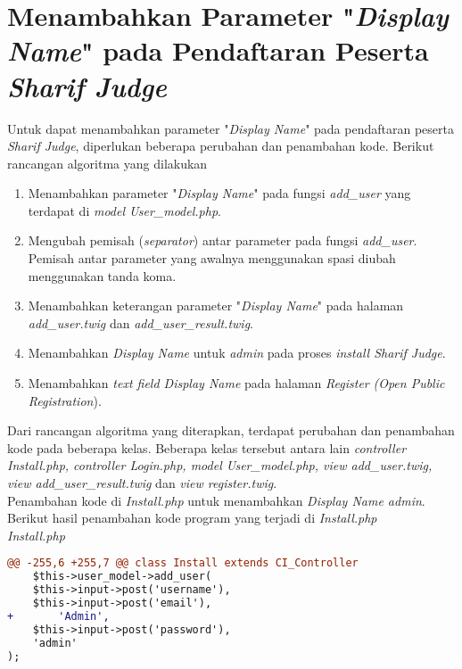 \section{Menambahkan Parameter "\textit{Display Name}" pada Pendaftaran Peserta \textit{Sharif Judge}}
Untuk dapat menambahkan parameter "\textit{Display Name}" pada pendaftaran peserta \textit{Sharif Judge}, diperlukan beberapa perubahan dan penambahan kode. Berikut rancangan algoritma yang dilakukan
\begin{enumerate}
	\item Menambahkan parameter "\textit{Display Name}" pada fungsi \textit{add\_user} yang terdapat di \textit{model User\_model.php}.
	\item Mengubah pemisah (\textit{separator}) antar parameter pada fungsi \textit{add\_user}. Pemisah antar parameter yang awalnya menggunakan spasi diubah menggunakan tanda koma.
	\item Menambahkan keterangan parameter "\textit{Display Name}" pada halaman \textit{add\_user.twig} dan  \textit{add\_user\_result.twig}.
	\item Menambahkan \textit{Display Name} untuk \textit{admin} pada proses \textit{install Sharif Judge}.
	\item Menambahkan \textit{text field Display Name} pada halaman \textit{Register} \textit{(Open Public Registration}).
\end{enumerate}
Dari rancangan algoritma yang diterapkan, terdapat perubahan dan penambahan kode pada beberapa kelas. Beberapa kelas tersebut antara lain \textit{controller Install.php, controller Login.php, model User\_model.php, view add\_user.twig, view add\_user\_result.twig} dan \textit{view register.twig}.
~\\
Penambahan kode di \textit{Install.php} untuk menambahkan \textit{Display Name admin}. Berikut hasil penambahan kode program yang terjadi di \textit{Install.php}\\
\textit{Install.php}
\begin{lstlisting}[language=diff, basicstyle=\ttfamily, frame=single,
columns=fullflexible, keepspaces=true, breaklines=true]
@@ -255,6 +255,7 @@ class Install extends CI_Controller
	$this->user_model->add_user(
	$this->input->post('username'),
	$this->input->post('email'),
+   	'Admin',
	$this->input->post('password'),
	'admin'
);
\end{lstlisting}
~\\
